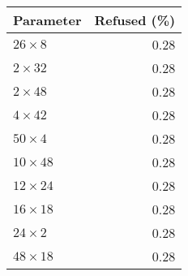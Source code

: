 \begin{tabular}{lr}
  \toprule
  Parameter & Refused (\%) \\
  \midrule
  $26 \times 8$ & 0.28 \\
  $2 \times 32$ & 0.28 \\
  $2 \times 48$ & 0.28 \\
  $4 \times 42$ & 0.28 \\
  $50 \times 4$ & 0.28 \\
  $10 \times 48$ & 0.28 \\
  $12 \times 24$ & 0.28 \\
  $16 \times 18$ & 0.28 \\
  $24 \times 2$ & 0.28 \\
  $48 \times 18$ & 0.28 \\
  \bottomrule
\end{tabular}

